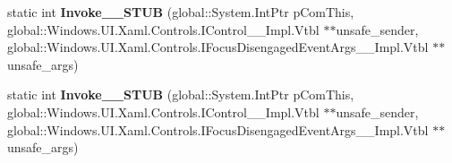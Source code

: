\begin{DoxyCompactItemize}
static int {\bfseries Invoke\+\_\+\+\_\+\+S\+T\+UB} (global\+::\+System.\+Int\+Ptr p\+Com\+This, global\+::\+Windows.\+U\+I.\+Xaml.\+Controls.\+I\+Control\+\_\+\+\_\+\+Impl.\+Vtbl $\ast$$\ast$unsafe\+\_\+sender, global\+::\+Windows.\+U\+I.\+Xaml.\+Controls.\+I\+Focus\+Disengaged\+Event\+Args\+\_\+\+\_\+\+Impl.\+Vtbl $\ast$$\ast$unsafe\+\_\+args)
\item 
\mbox{\label{struct_windows_1_1_foundation_1_1_typed_event_handler___a___windows___u_i___xaml___controls___cof52bacf1f8ce9dc6f9ea3c7dd11a16ef_abf135669e1854e3449624bff02c28cf0}} 
static int {\bfseries Invoke\+\_\+\+\_\+\+S\+T\+UB} (global\+::\+System.\+Int\+Ptr p\+Com\+This, global\+::\+Windows.\+U\+I.\+Xaml.\+Controls.\+I\+Control\+\_\+\+\_\+\+Impl.\+Vtbl $\ast$$\ast$unsafe\+\_\+sender, global\+::\+Windows.\+U\+I.\+Xaml.\+Controls.\+I\+Focus\+Disengaged\+Event\+Args\+\_\+\+\_\+\+Impl.\+Vtbl $\ast$$\ast$unsafe\+\_\+args)
\end{DoxyCompactItemize}

